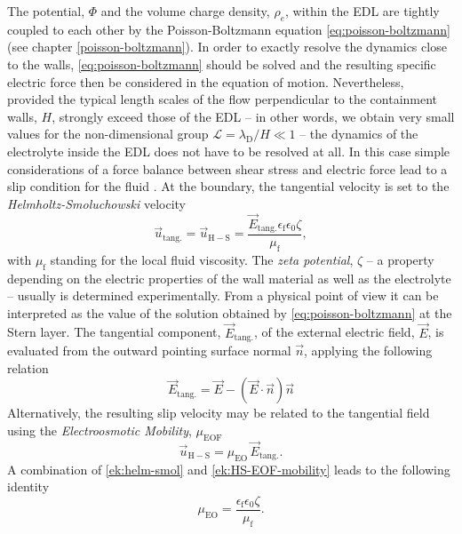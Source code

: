 The potential, $\Phi$ and the volume charge density, $\rho_{e}$, within the EDL are tightly coupled to each other by the Poisson-Boltzmann equation \eqref{eq:poisson-boltzmann} (see chapter \ref{poisson-boltzmann}). In order to exactly resolve the dynamics close to the walls, \eqref{eq:poisson-boltzmann} should be solved and the resulting specific electric force then be considered in the equation of motion. Nevertheless,  provided the typical length scales of the flow perpendicular to the containment walls, $H$, strongly exceed those of the EDL -- in other words, we obtain very small values for the non-dimensional group $\mathcal{L} = \lambda_{\mathrm{D}}/H \ll 1$ -- the dynamics of the electrolyte inside the EDL does not have to be resolved at all. In this case simple considerations of a force balance between shear stress and electric force lead to a slip condition for the fluid \cite{YaFuLi:2001}. At the boundary, the tangential velocity is set to the \textit{Helmholtz-Smoluchowski} velocity
\begin{equation}
\label{ek:helm-smol}
\vec{u}_{\mathrm{tang.}}=\vec{u}_{\mathrm{H-S}} = \frac{\vec{E}_{\mathrm{tang.}}\epsilon_{\mathrm{f}}\epsilon_{0}\zeta}{\mu_{\mathrm{f}}},
\end{equation}
with $\mu_{\mathrm{f}}$ standing for the local fluid viscosity. The \textit{zeta potential}, $\zeta$ -- a property depending on the electric properties of the wall material as well as the electrolyte -- usually is determined experimentally. From a physical point of view it can be interpreted as the value of the solution obtained by \eqref{eq:poisson-boltzmann} at the Stern layer. The tangential component, $\vec{E}_{\mathrm{tang.}}$,  of the external electric field, $\vec{E}$, is evaluated from the outward pointing surface normal $\vec{n}$, applying the following relation
\begin{equation}
\label{ek:etang}
\vec{E}_{\mathrm{tang.}} = \vec{E} - \left(\vec{E}\cdot\vec{n}\right)\vec{n}
\end{equation}
Alternatively, the resulting slip velocity may be related to the tangential field using the \textit{Electroosmotic Mobility}, $\mu_{\mathrm{EOF}}$
\begin{equation}
\label{ek:HS-EOF-mobility}
\vec{u}_{\mathrm{H-S}} = \mu_{\mathrm{EO}}\,\vec{E}_{\mathrm{tang.}}.
\end{equation}
A combination of \eqref{ek:helm-smol} and \eqref{ek:HS-EOF-mobility} leads to the following identity
\begin{equation}
\label{ek:EOF-mobility}
\mu_{\mathrm{EO}} =\frac{\epsilon_{\mathrm{f}}\epsilon_{0}\zeta}{\mu_{\mathrm{f}}}.
\end{equation}

